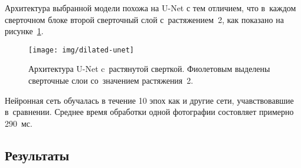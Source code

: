 Архитектура выбранной модели похожа на U-Net с тем отличием, 
что в~каждом сверточном блоке второй сверточный слой с~растяжением~2,
как показано на рисунке~\ref{fig:dilated-unet}.

\begin{figure}[ht]
  \texttt{[image: img/dilated-unet]}
  \caption{Архитектура U-Net c~растянутой сверткой. Фиолетовым выделены сверточные слои со~значением растяжения~2.}
  \label{fig:dilated-unet}
\end{figure}


Нейронная сеть обучалась в течение 10 эпох как и другие сети, 
учавствовавшие в~сравнении. Среднее время обработки одной фотографии
состовляет примерно 290~мс.

\newpage
\subsection{Результаты} 

